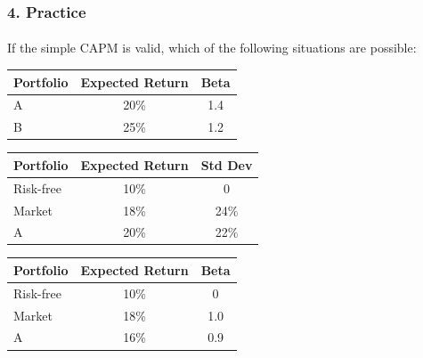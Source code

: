 \documentclass{beamer}
\begin{document}
\begin{practiceframe}[t]
    \frametitle{4. Practice}
    \framesubtitle{}

    If the simple CAPM is valid, which of the following situations are possible:

    \footnotesize
    \begin{table}
            \begin{tabular}{lcc}
                \toprule
                Portfolio & Expected Return & Beta\\
                \midrule
                A & 20\% & 1.4\\
                B & 25\% & 1.2\\
                \bottomrule
            \end{tabular}
        \end{table}

     \begin{table}
            \begin{tabular}{lcc}
                \toprule
                Portfolio & Expected Return & Std Dev\\
                \midrule
                Risk-free & 10\% & 0\\
                Market & 18\% & 24\%\\
                A & 20\% & 22\%\\
                \bottomrule
            \end{tabular}
        \end{table}

         \begin{table}
            \begin{tabular}{lcc}
                \toprule
                Portfolio & Expected Return & Beta\\
                \midrule
                Risk-free & 10\% & 0\\
                Market & 18\% & 1.0\\
                A & 16\% & 0.9\\
                \bottomrule
            \end{tabular}
        \end{table}

\end{practiceframe}
\end{document}
